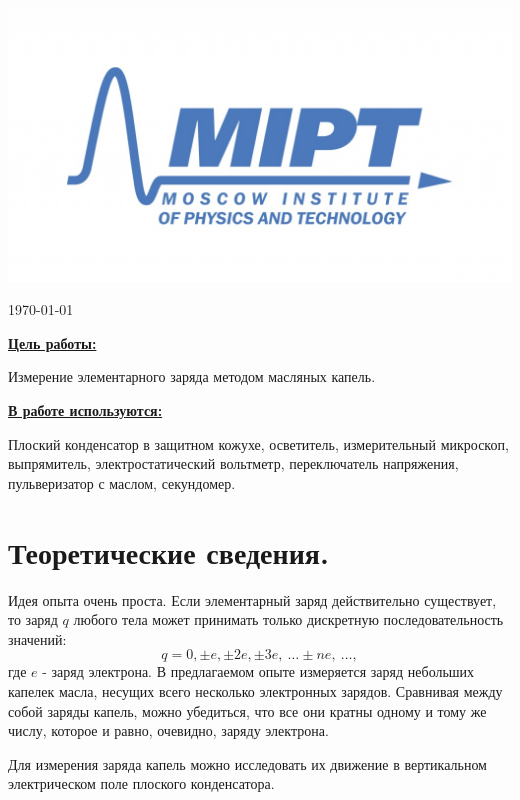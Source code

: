 \documentclass[a4paper, 12pt, twoside]{article}
\newenvironment{bottompar}{\par\vspace*{\fill}}{\clearpage}
\begin{document}
\begin{titlepage}
\begin{bottompar}
	\begin{center}
		\includegraphics[width = 80 mm]{logo.jpg}
	\end{center}
	{\large \today}

\end{bottompar}
\vfill %

\end{titlepage}

{\Large \uline { \textbf  {Цель работы:}}}

\vspace{2mm}
Измерение элементарного заряда методом масляных капель.
\vspace{\baselineskip}

{\Large \uline { \textbf  {В работе используются:}}}

\vspace{2mm}

Плоский конденсатор в защитном кожухе, осветитель, измерительный микроскоп, выпрямитель, электростатический вольтметр, переключатель напряжения, пульверизатор с маслом, секундомер.

\section{Теоретические сведения.}


Идея опыта очень проста. Если элементарный заряд действительно существует, то заряд $q$ любого тела может принимать только дискретную последовательность значений:
\begin{equation}
\label{f1}
q = 0, \pm e, \pm 2e, \pm 3e, ~ \ldots \pm ne,~ \ldots ,
\end{equation}
где $e$ - заряд электрона. В предлагаемом опыте измеряется заряд небольших капелек масла, несущих всего несколько электронных зарядов. Сравнивая между собой заряды капель, можно убедиться, что все они кратны одному и тому же числу, которое и равно, очевидно, заряду электрона.

Для измерения заряда капель можно исследовать их движение в вертикальном электрическом поле плоского конденсатора.
\end{document}
